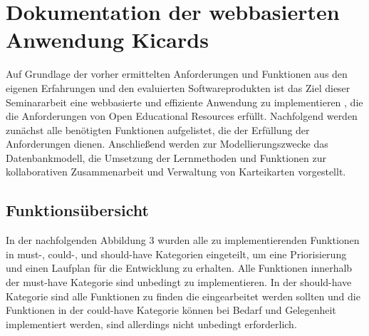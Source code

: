 \section{Dokumentation der webbasierten Anwendung Kicards}
Auf Grundlage der vorher ermittelten Anforderungen und Funktionen aus den eigenen Erfahrungen und den evaluierten Softwareprodukten ist das Ziel dieser Seminararbeit eine webbasierte und effiziente Anwendung zu implementieren \cite{kicards}, die die Anforderungen von Open Educational Resources erfüllt. Nachfolgend werden zunächst alle benötigten Funktionen aufgelistet, die der Erfüllung der Anforderungen dienen. Anschließend werden zur Modellierungszwecke das Datenbankmodell, die Umsetzung der Lernmethoden und Funktionen zur kollaborativen Zusammenarbeit und Verwaltung von Karteikarten vorgestellt.


\subsection{Funktionsübersicht}
In der nachfolgenden Abbildung 3 wurden alle zu implementierenden Funktionen in must-, could-, und should-have Kategorien eingeteilt, um eine Priorisierung und einen Laufplan für die Entwicklung zu erhalten. Alle Funktionen innerhalb der must-have Kategorie sind unbedingt zu implementieren. In der should-have Kategorie sind alle Funktionen zu finden die eingearbeitet werden sollten und die Funktionen in der could-have Kategorie können bei Bedarf und Gelegenheit implementiert werden, sind allerdings nicht unbedingt erforderlich. \\

